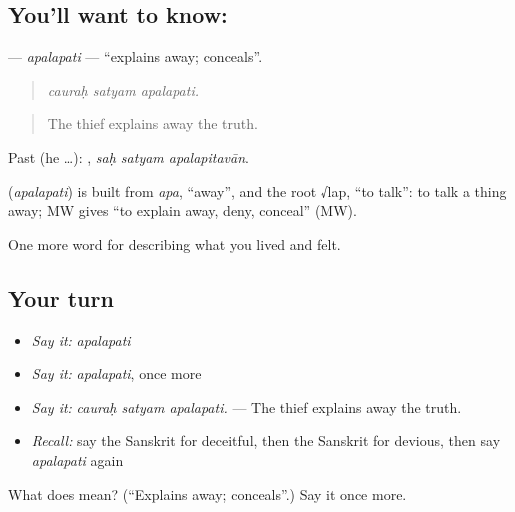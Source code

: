 \subsection*{You'll want to know: }
\textbf{} — \emph{apalapati} — \textquotedblleft{}explains away; conceals\textquotedblright{}.

\begin{quote}
  
\end{quote}

\begin{quote}
\emph{cauraḥ satyam apalapati.}
\end{quote}

\begin{quote}
The thief explains away the truth.
\end{quote}

Past (he …):   , \emph{saḥ satyam apalapitavān}.

\begin{cousinweb}
\textbf{} (\emph{apalapati}) is built from \emph{apa}, \textquotedblleft{}away\textquotedblright{}, and the root √lap, \textquotedblleft{}to talk\textquotedblright{}: to talk a thing away; MW gives \textquotedblleft{}to explain away, deny, conceal\textquotedblright{} (MW).
\end{cousinweb}

\begin{grammarlens}[title={What you've built}]
One more word for describing what you lived and felt.
\end{grammarlens}

\subsection*{Your turn}
\begin{itemize}
\raggedright
  \item \emph{Say it:} \emph{apalapati}
  \item \emph{Say it:} \emph{apalapati}, once more
  \item \emph{Say it:} \emph{cauraḥ satyam apalapati.} — The thief explains away the truth.
  \item \emph{Recall:} say the Sanskrit for deceitful, then the Sanskrit for devious, then say \emph{apalapati} again
\end{itemize}

\begin{tcolorbox}[breakable,colback=teal!4,colframe=teal!35!black,title={Before you move on}]
What does  mean? (\textquotedblleft{}Explains away; conceals\textquotedblright{}.) Say it once more.
\end{tcolorbox}
